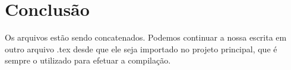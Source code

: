 \chapter{Conclusão}
\label{c.conclusao}

Os arquivos estão sendo concatenados. Podemos continuar a nossa escrita em outro arquivo .tex desde que ele seja importado no projeto principal, que é sempre o utilizado para efetuar a compilação.